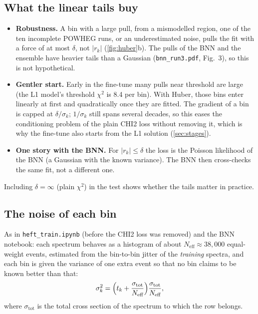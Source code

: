 \documentclass[11pt]{article}
\newcommand{\file}[1]{\nolinkurl{#1}}
\begin{document}
\subsection{What the linear tails buy}

\begin{itemize}
  \item \textbf{Robustness.} A bin with a large pull, from a mismodelled region, one of the
    ten incomplete POWHEG runs, or an underestimated noise, pulls the fit with a force of
    at most $\delta$, not $|r_k|$ (\cref{fig:huber}b). The pulls of the BNN and the
    ensemble have heavier tails than a Gaussian (\file{bnn_run3.pdf}, Fig.~3), so this is
    not hypothetical.
  \item \textbf{Gentler start.} Early in the fine-tune many pulls near threshold are large
    (the L1 model's threshold $\chi^2$ is 8.4 per bin). With Huber, those bins enter
    linearly at first and quadratically once they are fitted. The gradient of a bin is
    capped at $\delta/\sigma_k$; $1/\sigma_k$ still spans several decades, so this eases
    the conditioning problem of the plain CHI2 loss without removing it, which is why the
    fine-tune also starts from the L1 solution (\cref{sec:stages}).
  \item \textbf{One story with the BNN.} For $|r_k| \le \delta$ the loss is the Poisson
    likelihood of the BNN (a Gaussian with the known variance). The BNN then cross-checks
    the same fit, not a different one.
\end{itemize}

\noindent Including $\delta = \infty$ (plain $\chi^2$) in the test shows whether the tails
matter in practice.

\subsection{The noise of each bin}
\label{sec:noise}

As in \file{heft_train.ipynb} (before the CHI2 loss was removed) and the BNN notebook: each
spectrum behaves as a histogram of about $N_\text{eff} \approx 38{,}000$ equal-weight
events, estimated from the bin-to-bin jitter of the \emph{training} spectra, and each bin
is given the variance of one extra event so that no bin claims to be known better than
that:
\begin{equation}
  \sigma_k^2 = \Bigl(t_k + \frac{\sigma_\text{tot}}{N_\text{eff}}\Bigr)
               \frac{\sigma_\text{tot}}{N_\text{eff}},
  \label{eq:noise}
\end{equation}
where $\sigma_\text{tot}$ is the total cross section of the spectrum to which the row
belongs.
\end{document}
